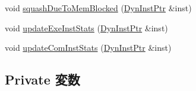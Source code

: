\begin{DoxyCompactItemize}
\item 
void \hyperlink{classLWBackEnd_a5fcf443dc6ada1ab1936df923c3205d2}{squashDueToMemBlocked} (\hyperlink{classLWBackEnd_a028ce10889c5f6450239d9e9a7347976}{DynInstPtr} \&inst)
\item 
void \hyperlink{classLWBackEnd_a132db67a5c42af856da64e347e8284d8}{updateExeInstStats} (\hyperlink{classLWBackEnd_a028ce10889c5f6450239d9e9a7347976}{DynInstPtr} \&inst)
\item 
void \hyperlink{classLWBackEnd_a5bbf266cb0cc97eed138c8fe0d2d76b6}{updateComInstStats} (\hyperlink{classLWBackEnd_a028ce10889c5f6450239d9e9a7347976}{DynInstPtr} \&inst)
\end{DoxyCompactItemize}
\subsection*{Private 変数}
